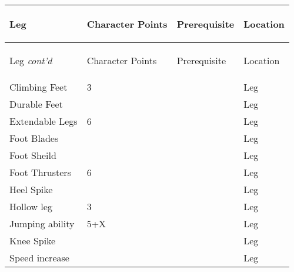 \documentclass[twoside]{book}
\begin{document}
\begin{longtable}{p{1.25in}p{2em}ll} 
  Leg& \begin{turn}{70}{Character Points}\end{turn}
          & \begin{turn}{70}{Prerequisite}\end{turn}
          & \begin{turn}{70}{Location}\end{turn}
          \\
  \hline
  \hline
  \endfirsthead
  Leg \textit{cont'd}
        & \begin{turn}{70}{Character Points}\end{turn}
          & \begin{turn}{70}{Prerequisite}\end{turn}
          & \begin{turn}{70}{Location}\end{turn}
           \\
  \hline
  \endhead
\raggedright Climbing Feet & 3 && Leg \tabularnewline
      \raggedright Durable Feet &&& Leg \tabularnewline
      \raggedright Extendable Legs & 6 && Leg \tabularnewline
      \raggedright Foot Blades &&& Leg \tabularnewline
      \raggedright Foot Sheild &&& Leg \tabularnewline
      \raggedright Foot Thrusters & 6 && Leg \tabularnewline
      \raggedright Heel Spike &&& Leg \tabularnewline
      \raggedright Hollow leg & 3 && Leg \tabularnewline
      \raggedright Jumping ability & 5+X && Leg \tabularnewline
      \raggedright Knee Spike &&& Leg \tabularnewline
      \raggedright Speed increase &&& Leg \tabularnewline
      
\end{longtable}
    
\end{document}
